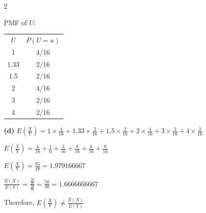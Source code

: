 \documentclass[12 pt]{article}
\begin{document}
\begin{exercise}{2}
    \hfill

    PMF of $U$:

    \begin{tabular}{c|c}
        $U$ & $P(U=u)$ \\
        1 & 4/16 \\
        1.33 & 2/16 \\
        1.5 & 2/16 \\
        2 & 4/16 \\
        3 & 2/16 \\
        4 & 2/16
    \end{tabular}

    \hfill

    \textbf{(d)}
    $E(\frac{X}{Y}) = 1 \times \frac{4}{16} + 1.33 \times \frac{2}{16} + 1.5 \times \frac{2}{16} + 2 \times \frac{4}{16} + 3 \times \frac{2}{16} + 4 \times \frac{2}{16}$

    $E(\frac{X}{Y}) = \frac{4}{16} + \frac{1}{6} + \frac{3}{16} + \frac{8}{16} + \frac{6}{16} + \frac{8}{16}$

    $E(\frac{X}{Y}) = \frac{95}{48} = 1.979166667$

    \hfill

    $\frac{E(X)}{E(Y)} = \frac{\frac{50}{16}}{\frac{30}{16}} = \frac{50}{30} = 1.6666666667$

    \hfill

    Therefore, $E(\frac{X}{Y}) \neq \frac{E(X)}{E(Y)}$

    \hfill
    \end{exercise}
\end{document}
